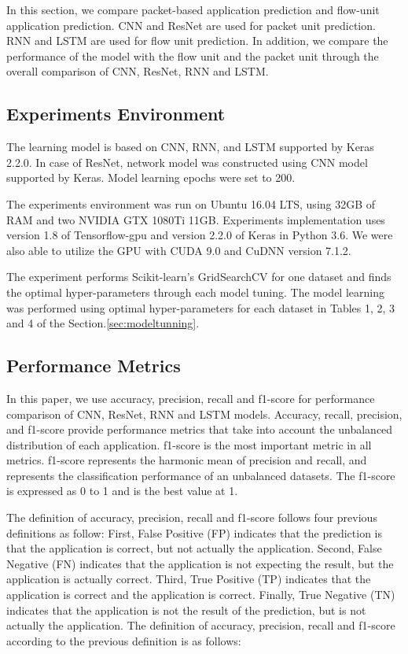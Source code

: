 In this section, we compare packet-based application prediction and flow-unit application prediction.
CNN and ResNet are used for packet unit prediction.
RNN and LSTM are used for flow unit prediction.
In addition, we compare the performance of the model with the flow unit and the packet unit through the overall comparison of CNN, ResNet, RNN and LSTM.

\subsection{Experiments Environment}
The learning model is based on CNN, RNN, and LSTM supported by Keras 2.2.0.
In case of ResNet, network model was constructed using CNN model supported by Keras.
Model learning epochs were set to 200.

The experiments environment was run on Ubuntu 16.04 LTS, using 32GB of RAM and two NVIDIA GTX 1080Ti 11GB.
Experiments implementation uses version 1.8 of Tensorflow-gpu and version 2.2.0 of Keras in Python 3.6.
We were also able to utilize the GPU with CUDA 9.0 and CuDNN version 7.1.2.

The experiment performs Scikit-learn's GridSearchCV for one dataset and finds the optimal hyper-parameters through each model tuning.
The model learning was performed using optimal hyper-parameters for each dataset in Tables 1, 2, 3 and 4 of the Section.\ref{sec:modeltunning}.

\subsection{Performance Metrics}
In this paper, we use accuracy, precision, recall and f1-score for performance comparison of CNN, ResNet, RNN and LSTM models.
Accuracy, recall, precision, and f1-score provide performance metrics that take into account the unbalanced distribution of each application.
f1-score is the most important metric in all metrics.
f1-score represents the harmonic mean of precision and recall, and represents the classification performance of an unbalanced datasets.
The f1-score is expressed as 0 to 1 and is the best value at 1.

The definition of accuracy, precision, recall and f1-score follows four previous definitions as follow:
First, False Positive (FP) indicates that the prediction is that the application is correct, but not actually the application.
Second, False Negative (FN) indicates that the application is not expecting the result, but the application is actually correct.
Third, True Positive (TP) indicates that the application is correct and the application is correct.
Finally, True Negative (TN) indicates that the application is not the result of the prediction, but is not actually the application.
The definition of accuracy, precision, recall and f1-score according to the previous definition is as follows:

